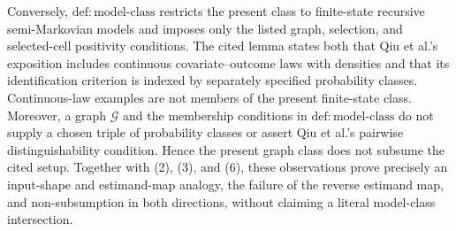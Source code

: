 Conversely, \(\mathrm{def:model\text{-}class}\) restricts the present class to finite-state recursive semi-Markovian models and imposes only the listed graph, selection, and selected-cell positivity conditions.  The cited lemma states both that Qiu et al.'s exposition includes continuous covariate--outcome laws with densities and that its identification criterion is indexed by separately specified probability classes.  Continuous-law examples are not members of the present finite-state class.  Moreover, a graph \(\mathcal G\) and the membership conditions in \(\mathrm{def:model\text{-}class}\) do not supply a chosen triple of probability classes or assert Qiu et al.'s pairwise distinguishability condition.  Hence the present graph class does not subsume the cited setup.  Together with (2), (3), and (6), these observations prove precisely an input-shape and estimand-map analogy, the failure of the reverse estimand map, and non-subsumption in both directions, without claiming a literal model-class intersection.